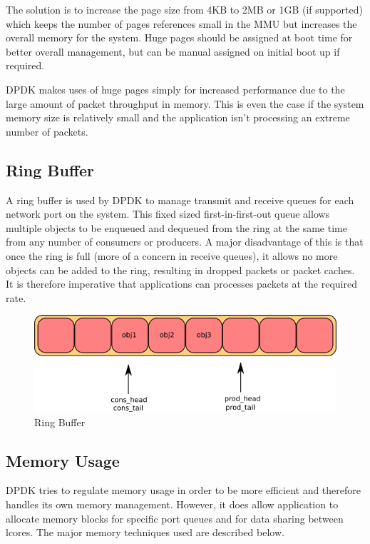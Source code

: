\documentclass[final_report.tex]{subfiles}
\begin{document}
The solution is to increase the page size from 4KB to 2MB or 1GB (if supported) which keeps the number of pages references small in the MMU but increases the overall memory for the system. Huge pages should be assigned at boot time for better overall management, but can be manual assigned on initial boot up if required.

DPDK makes uses of huge pages simply for increased performance due to the large amount of packet throughput in memory. This is even the case if the system memory size is relatively small and the application isn't processing an extreme number of packets.

\subsection{Ring Buffer}
A ring buffer is used by DPDK to manage transmit and receive queues for each network port on the system. This fixed sized first-in-first-out queue allows multiple objects to be enqueued and dequeued from the ring at the same time from any number of consumers or producers. A major disadvantage of this is that once the ring is full (more of a concern in receive queues), it allows no more objects can be added to the ring, resulting in dropped packets or packet caches. It is therefore imperative that applications can processes packets at the required rate.

\begin{figure}[H]
	\centering
	\includegraphics[width=\textwidth]{img/ring.png}
	\caption{Ring Buffer}
	\label{fig:ring}
\end{figure}

\subsection{Memory Usage}
DPDK tries to regulate memory usage in order to be more efficient and therefore handles its own memory management. However, it does allow application to allocate memory blocks for specific port queues and for data sharing between lcores. The major memory techniques used are described below.
\end{document}
